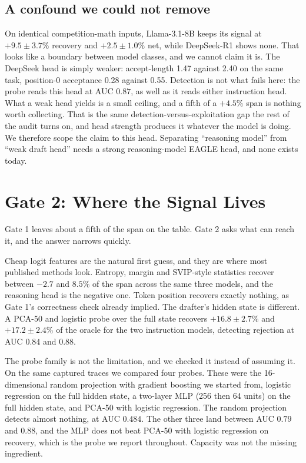 \documentclass[conference]{IEEEtran}
\begin{document}
\subsection{A confound we could not remove}
On identical competition-math inputs, Llama-3.1-8B keeps its signal at $+9.5\pm3.7\%$ recovery
and $+2.5\pm1.0\%$ net, while DeepSeek-R1 shows none. That looks like a boundary between model
classes, and we cannot claim it is. The DeepSeek head is simply weaker: accept-length 1.47
against 2.40 on the same task, position-0 acceptance 0.28 against 0.55. Detection is not what
fails here: the probe reads this head at AUC $0.87$, as well as it reads either instruction
head. What a weak head yields is a small ceiling, and a fifth of a $+4.5\%$ span is nothing
worth collecting. That is the same detection-versus-exploitation gap the rest of the audit
turns on, and head strength produces it whatever the model is doing. We therefore scope the
claim to this head. Separating ``reasoning model'' from ``weak draft head'' needs a strong
reasoning-model EAGLE head, and none exists today.

\section{Gate 2: Where the Signal Lives}
\label{sec:gate2}
Gate 1 leaves about a fifth of the span on the table. Gate 2 asks what can reach it, and the
answer narrows quickly.

Cheap logit features are the natural first guess, and they are where most published methods
look. Entropy, margin and SVIP-style statistics recover between $-2.7$ and $8.5\%$ of the
span across the same three models, and the reasoning head is the negative one.
Token position recovers exactly nothing, as Gate 1's correctness check already implied. The
drafter's hidden state is different. A PCA-50 and logistic probe over the full state recovers
$+16.8\pm2.7\%$ and $+17.2\pm2.4\%$ of the oracle for the two instruction models, detecting
rejection at AUC $0.84$ and $0.88$.

The probe family is not the limitation, and we checked it instead of assuming it. On the
same captured traces we compared four probes. These were the 16-dimensional random projection
with gradient boosting we started from, logistic regression on the full hidden state, a
two-layer MLP (256 then 64 units) on the full hidden state, and PCA-50 with logistic
regression. The
random projection detects almost nothing, at AUC $0.484$. The other three land between AUC
$0.79$ and $0.88$, and the MLP does not beat PCA-50 with logistic regression on recovery,
which is the probe we report throughout. Capacity was not the missing ingredient.
\end{document}
